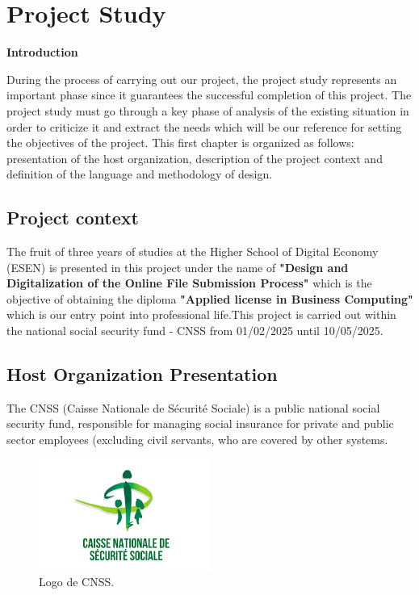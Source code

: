 \chapter{Project Study}
\newpage
\begin{center}
    \centering
    \LARGE\textbf{Introduction} 
     \vspace{1cm} \\
   \raggedright
\end{center}
During the process of carrying out our project, the project study represents an important phase since it guarantees the successful completion of this project. The project study must go through a key phase of analysis of the existing situation in order to criticize it and extract the needs which will be our reference for setting the objectives of the project. This first chapter is organized as follows: presentation of the host organization, description of the project context and definition of the language and methodology of design.

\section{ Project context}
The fruit of three years of studies at the Higher School of Digital Economy (ESEN) is presented in this project under the name of \textbf{"Design and
Digitalization of the Online File Submission Process"} which is the objective of obtaining the diploma \textbf{"Applied license in Business Computing"} which is our entry point into professional life.This project is carried out within the national social security fund - CNSS from 01/02/2025 until 10/05/2025.
\section{Host Organization Presentation}
The CNSS (Caisse Nationale de Sécurité Sociale) is a public national social security fund, responsible for managing social insurance for private and public sector employees (excluding civil servants, who are covered by other systems.\\

\begin{figure}[htbp]
    \centering
    \includegraphics[width=0.5\textwidth]{figures/logocnss.png}
    \caption{Logo de CNSS.}
\end{figure} \

